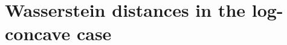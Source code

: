 \documentclass[12pt,a4paper]{article}
\newcommand{\EE}{\mathbb{E}}
\newcommand{\RR}{\mathbb{R}}
\newcommand{\cC}{\mathcal C}
\newcommand{\cN}{\mathcal N}
\renewcommand{\tilde}{\widetilde}
\newtheorem{lemma}[theorem]{Lemma}
\theoremstyle{definition}
\begin{document}
%
%
%
%
%
%

\section{Wasserstein distances in the log-concave case}
\label{sec3}
\end{document}
